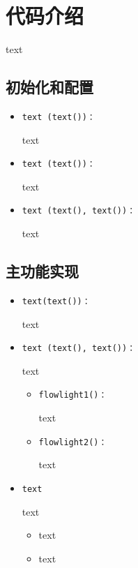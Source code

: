 \section{代码介绍}
text
\subsection{初始化和配置}
\begin{itemize}
    \item \begin{verbatim}text (text())：\end{verbatim}text
    \item \begin{verbatim}text (text())：\end{verbatim}text
    \item \begin{verbatim}text (text(), text())：\end{verbatim}text
\end{itemize}



\subsection{主功能实现}
\begin{itemize}
    \item \begin{verbatim}text(text())：\end{verbatim}text
    \item \begin{verbatim}text (text(), text())：\end{verbatim}text
          \begin{itemize}
              \item \begin{verbatim}flowlight1()：\end{verbatim}text
              \item \begin{verbatim}flowlight2()：\end{verbatim}text
          \end{itemize}
    \item \begin{verbatim}text\end{verbatim}
          text
          \begin{itemize}
              \item text
              \item text
          \end{itemize}

\end{itemize}



